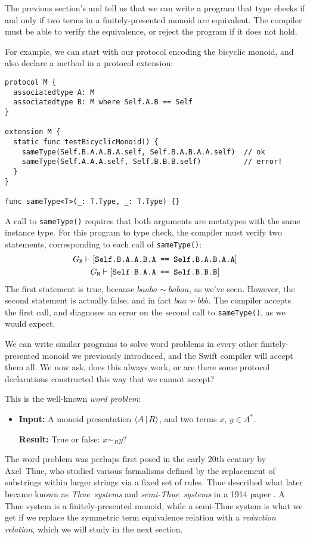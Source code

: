 \documentclass[../generics]{subfiles}
\begin{document}
The previous section's  and  tell us that we can write a program that type checks if and only if two terms in a finitely-presented monoid are equivalent. The compiler must be able to verify the equivalence, or reject the program if it does not hold.

For example, we can start with our protocol encoding the bicyclic monoid, and also declare a method in a protocol extension:
\begin{Verbatim}
protocol M {
  associatedtype A: M
  associatedtype B: M where Self.A.B == Self
}

extension M {
  static func testBicyclicMonoid() {
    sameType(Self.B.A.A.B.A.self, Self.B.A.B.A.A.self)  // ok
    sameType(Self.A.A.A.self, Self.B.B.B.self)          // error!
  }
}

func sameType<T>(_: T.Type, _: T.Type) {}
\end{Verbatim}
A call to \texttt{sameType()} requires that both arguments are metatypes with the same instance type. For this program to type check, the compiler must verify two statements, corresponding to each call of \texttt{sameType()}:
\begin{gather*}
G_\texttt{M}\vdash[\texttt{Self.B.A.A.B.A == Self.B.A.B.A.A}]\\
G_\texttt{M}\vdash[\texttt{Self.B.A.A == Self.B.B.B}]
\end{gather*}
The first statement is true, because $baaba\sim babaa$, as we've seen. However, the second statement is actually false, and in fact $baa\not\sim bbb$. The compiler accepts the first call, and diagnoses an error on the second call to \texttt{sameType()}, as we would expect.

We can write similar programs to solve word problems in every other finitely-presented monoid we previously introduced, and the Swift compiler will accept them all. We now ask, does this always work, or are there some protocol declarations constructed this way that we cannot accept?

This is the well-known \emph{word problem}:
\begin{itemize}
\item
\textbf{Input:} A monoid presentation $\langle A\,|\,R\rangle$, and two terms $x$, $y\in A^*$.

\textbf{Result:} True or false: $x\sim_R y$?
\end{itemize}

The word problem was perhaps first posed in the early 20th century by Axel~Thue, who studied various formalisms defined by the replacement of substrings within larger strings via a fixed set of rules. Thue described what later became known as \emph{Thue~systems} and \emph{semi-Thue~systems} in a 1914 paper \cite{thue_translation}. A Thue system is a finitely-presented monoid, while a semi-Thue system is what we get if we replace the symmetric term equivalence relation with a \emph{reduction relation}, which we will study in the next section.
\end{document}

